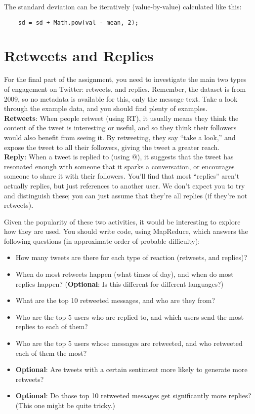 \documentclass[a4paper,10pt]{article}
\begin{document}
  The standard deviation can be iteratively (value-by-value) calculated like this: 
  \begin{lstlisting}
    sd = sd + Math.pow(val - mean, 2);
  \end{lstlisting}
  
  \section{Retweets and Replies}

  For the final part of the assignment, you need to investigate the main two types of
  engagement on Twitter: retweets, and replies. Remember, the dataset is from 2009,
  so no metadata is available for this, only the message text. Take a look through the
  example data, and you should find plenty of examples. \\

  \textbf{Retweets}: When people retweet (using RT), it usually means they think the content of the tweet is interesting or useful,
  and so they think their followers would also benefit from seeing it. By retweeting, they say ``take a look,''  and expose
  the tweet to all their followers, giving the tweet a greater reach. \\
  
  \textbf{Reply}: When a tweet is replied to (using @), it suggests that the tweet has
  resonated enough with someone that it sparks a conversation, or encourages
  someone to share it with their followers.
  You'll find that most ``replies'' aren't actually replies, but just references to another user. We don't expect you to try and distinguish these;
  you can just assume that they're all replies (if they're not retweets).

  Given the popularity of these two activities, it would be interesting to explore how they are used. You should write code, using MapReduce,
  which answers the following questions (in approximate order of probable difficulty):

  \begin{itemize}
  \item How many tweets are there for each type of reaction (retweets, and replies)?
  \item When do most retweets happen (what times of day), and when do most replies happen? (\textbf{Optional}: Is this different for different languages?)
  \item What are the top 10 retweeted messages, and who are they from?
  \item Who are the top 5 users who are replied to, and which users send the most replies to each of them?
  \item Who are the top 5 users whose messages are retweeted, and who retweeted each of them the most?
  \item \textbf{Optional}: Are tweets with a certain sentiment more likely to generate more retweets?
  \item \textbf{Optional}: Do those top 10 retweeted messages get significantly more replies? (This one might be quite tricky.)
  \end{itemize}
\end{document}
